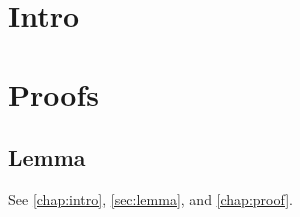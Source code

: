 \chapter{Intro}\label{chap:intro}
\appendix
\chapter{Proofs}\label{chap:proof}
\section{Lemma}\label{sec:lemma}
See \autoref{chap:intro}, \autoref{sec:lemma}, and \autoref{chap:proof}.
